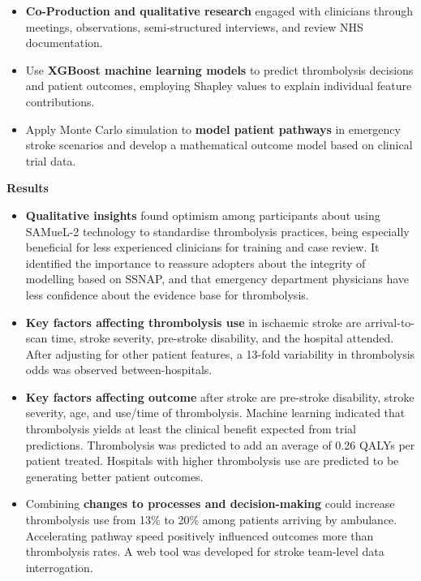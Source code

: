 \begin{itemize}

    \item \textbf{Co-Production and qualitative research} engaged with clinicians through meetings, observations, semi-structured interviews, and review NHS documentation.

    \item Use \textbf{XGBoost machine learning models} to predict thrombolysis decisions and patient outcomes, employing Shapley values to explain individual feature contributions.

    \item Apply Monte Carlo simulation to \textbf{model patient pathways} in emergency stroke scenarios and develop a mathematical outcome model based on clinical trial data.

\end{itemize}

\textbf{Results}

\begin{itemize}

    \item \textbf{Qualitative insights} found optimism among participants about using SAMueL-2 technology to standardise thrombolysis practices, being especially beneficial for less experienced clinicians for training and case review. It identified the importance to reassure adopters about the integrity of modelling based on SSNAP, and that emergency department physicians have less confidence about the evidence base for thrombolysis.
    \item \textbf{Key factors affecting thrombolysis use} in ischaemic stroke are arrival-to-scan time, stroke severity, pre-stroke disability, and the hospital attended. After adjusting for other patient features, a 13-fold variability in thrombolysis odds was observed between-hospitals.
    \item \textbf{Key factors affecting outcome} after stroke are pre-stroke disability, stroke severity, age, and use/time of thrombolysis. Machine learning indicated that thrombolysis yields at least the clinical benefit expected from trial predictions. Thrombolysis was predicted to add an average of 0.26 QALYs per patient treated. Hospitals with higher thrombolysis use are predicted to be generating better patient outcomes.
    \item Combining \textbf{changes to processes and decision-making} could increase thrombolysis use from 13\% to 20\% among patients arriving by ambulance. Accelerating pathway speed positively influenced outcomes more than thrombolysis rates. A web tool was developed for stroke team-level data interrogation.

    \end{itemize}

